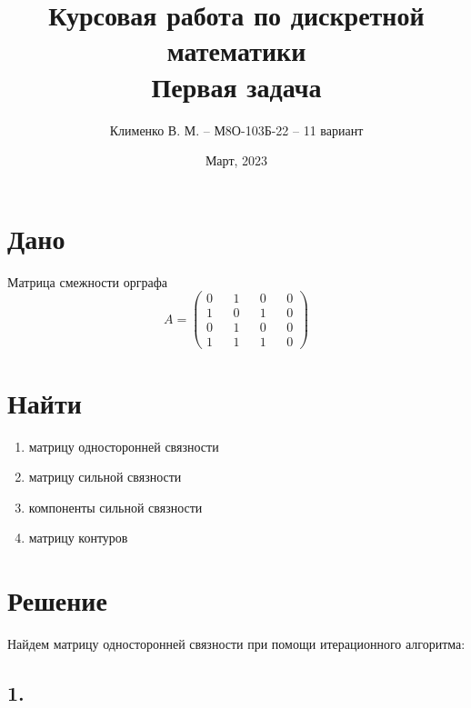 \documentclass{article}
\title{Курсовая работа по дискретной математики\\Первая задача}
\author{Клименко В. М. -- М8О-103Б-22 -- 11 вариант}
\date{Март, 2023}
\begin{document}
\maketitle
               
\section*{Дано}
Матрица смежности орграфа
$$
A =
\begin{pmatrix}
  0 && 1 && 0 && 0 \\
  1 && 0 && 1 && 0 \\
  0 && 1 && 0 && 0 \\
  1 && 1 && 1 && 0
\end{pmatrix}
$$

\section*{Найти}
\begin{enumerate}
\item матрицу односторонней связности
\item матрицу сильной связности
\item компоненты сильной связности 
\item матрицу контуров
\end{enumerate}

\section*{Решение}
Найдем матрицу односторонней связности при помощи итерационного алгоритма:

\subsection*{1.}
\end{document}
